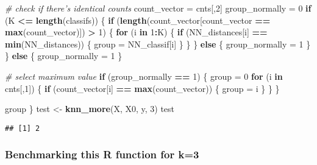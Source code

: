 \documentclass[]{article}
\newenvironment{Shaded}{\begin{snugshade}}{\end{snugshade}}
\newcommand{\CommentTok}[1]{\textcolor[rgb]{0.56,0.35,0.01}{\textit{#1}}}
\newcommand{\ControlFlowTok}[1]{\textcolor[rgb]{0.13,0.29,0.53}{\textbf{#1}}}
\newcommand{\DecValTok}[1]{\textcolor[rgb]{0.00,0.00,0.81}{#1}}
\newcommand{\KeywordTok}[1]{\textcolor[rgb]{0.13,0.29,0.53}{\textbf{#1}}}
\newcommand{\NormalTok}[1]{#1}
\newcommand{\OperatorTok}[1]{\textcolor[rgb]{0.81,0.36,0.00}{\textbf{#1}}}
\newcommand{\StringTok}[1]{\textcolor[rgb]{0.31,0.60,0.02}{#1}}
\begin{document}
\begin{Shaded}
\begin{Highlighting}[]
  \CommentTok{# check if there's identical counts}
\NormalTok{  count_vector =}\StringTok{ }\NormalTok{cnts[,}\DecValTok{2}\NormalTok{]}
\NormalTok{  group_normally =}\StringTok{ }\DecValTok{0}
  \ControlFlowTok{if}\NormalTok{ (K }\OperatorTok{<=}\StringTok{ }\KeywordTok{length}\NormalTok{(classifs)) \{}
    \ControlFlowTok{if}\NormalTok{ (}\KeywordTok{length}\NormalTok{(count_vector[count_vector }\OperatorTok{==}\StringTok{ }\KeywordTok{max}\NormalTok{(count_vector)]) }\OperatorTok{>}\StringTok{ }\DecValTok{1}\NormalTok{) \{}
      \ControlFlowTok{for}\NormalTok{ (i }\ControlFlowTok{in} \DecValTok{1}\OperatorTok{:}\NormalTok{K) \{}
        \ControlFlowTok{if}\NormalTok{ (NN_distances[i] }\OperatorTok{==}\StringTok{ }\KeywordTok{min}\NormalTok{(NN_distances)) \{}
\NormalTok{          group =}\StringTok{ }\NormalTok{NN_classif[i]}
\NormalTok{        \}}
\NormalTok{      \}}
\NormalTok{    \} }\ControlFlowTok{else}\NormalTok{ \{}
\NormalTok{      group_normally =}\StringTok{ }\DecValTok{1}
\NormalTok{    \} }
\NormalTok{  \} }
  \ControlFlowTok{else}\NormalTok{ \{}
\NormalTok{    group_normally =}\StringTok{ }\DecValTok{1}
\NormalTok{  \}}
  
  \CommentTok{# select maximum value}
  \ControlFlowTok{if}\NormalTok{ (group_normally }\OperatorTok{==}\StringTok{ }\DecValTok{1}\NormalTok{) \{}
\NormalTok{    group =}\StringTok{ }\DecValTok{0}
    \ControlFlowTok{for}\NormalTok{ (i }\ControlFlowTok{in}\NormalTok{ cnts[,}\DecValTok{1}\NormalTok{]) \{}
      \ControlFlowTok{if}\NormalTok{ (count_vector[i] }\OperatorTok{==}\StringTok{ }\KeywordTok{max}\NormalTok{(count_vector)) \{}
\NormalTok{        group =}\StringTok{ }\NormalTok{i}
\NormalTok{      \}}
\NormalTok{    \}}
\NormalTok{  \}}

\NormalTok{  group}
\NormalTok{\}  }
\NormalTok{test <-}\StringTok{ }\KeywordTok{knn_more}\NormalTok{(X, X0, y, }\DecValTok{3}\NormalTok{)}
\NormalTok{test}
\end{Highlighting}
\end{Shaded}

\begin{verbatim}
## [1] 2
\end{verbatim}

\hypertarget{benchmarking-this-r-function-for-k3}{%
\subsubsection{Benchmarking this R function for
k=3}\label{benchmarking-this-r-function-for-k3}}
\end{document}
